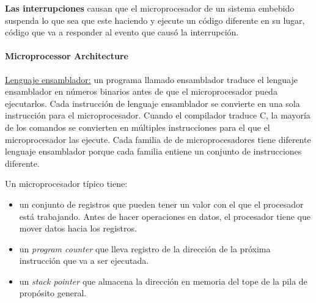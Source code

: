 \textbf{Las interrupciones} causan que el microprocesador de un sistema embebido suspenda lo que sea que este haciendo y ejecute un código diferente en su lugar, código que va a responder al evento que causó la interrupción.

\paragraph{\textnormal{\textbf{Microprocessor Architecture}}}
\underline{Lenguaje ensamblador:} un programa llamado ensamblador traduce el lenguaje ensamblador en números binarios antes de que el microprocesador pueda ejecutarlos. Cada instrucción de lenguaje ensamblador se convierte en una sola instrucción para el microprocesador. Cuando el compilador traduce C, la mayoría de los comandos se convierten en múltiples instrucciones para el que el microprocesador las ejecute. Cada familia de de microprocesadores tiene diferente lenguaje ensamblador porque cada familia entiene un conjunto de instrucciones diferente.

Un microprocesador típico tiene:
\begin{itemize}
    \item un conjunto de registros que pueden tener un valor con el que el procesador está trabajando. Antes de hacer operaciones en datos, el procesador tiene que mover datos hacia los registros.
    \item un \textit{program counter} que lleva registro de la dirección de la próxima instrucción que va a ser ejecutada.
    \item un \textit{stack pointer} que almacena la dirección en memoria del tope de la pila de propósito general.
\end{itemize}


